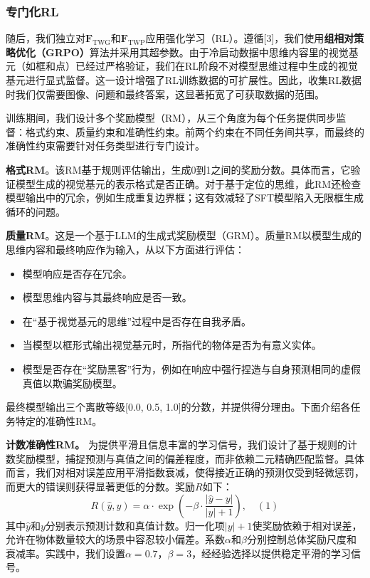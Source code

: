 \documentclass[11pt,a4paper]{article}
\begin{document}
\subsubsection{专门化RL}

随后，我们独立对$\mathbf{F}_{\mathrm{TWG}}$和$\mathbf{F}_{\mathrm{TWP}}$应用强化学习（RL）。遵循[3]，我们使用\textbf{组相对策略优化（GRPO）}算法并采用其超参数。由于冷启动数据中思维内容里的视觉基元（如框和点）已经过严格验证，我们在RL阶段不对模型思维过程中生成的视觉基元进行显式监督。这一设计增强了RL训练数据的可扩展性。因此，收集RL数据时我们仅需要图像、问题和最终答案，这显著拓宽了可获取数据的范围。

训练期间，我们设计多个奖励模型（RM），从三个角度为每个任务提供同步监督：格式约束、质量约束和准确性约束。前两个约束在不同任务间共享，而最终的准确性约束需要针对任务类型进行专门设计。

\textbf{格式RM}。该RM基于规则评估输出，生成0到1之间的奖励分数。具体而言，它验证模型生成的视觉基元的表示格式是否正确。对于基于定位的思维，此RM还检查模型输出中的冗余，例如生成重复边界框；这有效减轻了SFT模型陷入无限框生成循环的问题。

\textbf{质量RM}。这是一个基于LLM的生成式奖励模型（GRM）。质量RM以模型生成的思维内容和最终响应作为输入，从以下方面进行评估：
\begin{itemize}
    \item 模型响应是否存在冗余。
    \item 模型思维内容与其最终响应是否一致。
    \item 在“基于视觉基元的思维”过程中是否存在自我矛盾。
    \item 当模型以框形式输出视觉基元时，所指代的物体是否为有意义实体。
    \item 模型是否存在“奖励黑客”行为，例如在响应中强行捏造与自身预测相同的虚假真值以欺骗奖励模型。
\end{itemize}
最终模型输出三个离散等级[0.0, 0.5, 1.0]的分数，并提供得分理由。下面介绍各任务特定的准确性RM。

\textbf{计数准确性RM。} 为提供平滑且信息丰富的学习信号，我们设计了基于规则的计数奖励模型，捕捉预测与真值之间的偏差程度，而非依赖二元精确匹配监督。具体而言，我们对相对误差应用平滑指数衰减，使得接近正确的预测仅受到轻微惩罚，而更大的错误则获得显著更低的分数。奖励$R$如下：
\[
R(\hat{y},y) = \alpha \cdot \exp \left(-\beta \cdot \frac{|\hat{y} - y|}{|y| + 1}\right), \quad (1)
\]
其中$\hat{y}$和$y$分别表示预测计数和真值计数。归一化项$|y| + 1$使奖励依赖于相对误差，允许在物体数量较大的场景中容忍较小偏差。系数$\alpha$和$\beta$分别控制总体奖励尺度和衰减率。实践中，我们设置$\alpha = 0.7$，$\beta = 3$，经经验选择以提供稳定平滑的学习信号。
\end{document}
